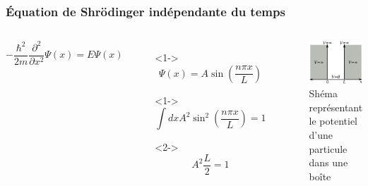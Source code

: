 \documentclass{beamer}
\begin{document}
\begin{frame}
\frametitle{Équation de Shrödinger indépendante du temps}

\begin{columns}

\begin{equation}\tag{4}
-\frac{\hbar^2}{2m}\frac{\partial^2}{\partial x^2}\Psi(x)=E\Psi(x)
\end{equation} 

\begin{itemize}
\item[]<1-> \begin{equation}\tag{5}
\Psi(x)=A\sin(\frac{n\pi x}{L})
\end{equation}  
\item[]<1-> \begin{equation}\tag{6}
\int dx A^2\sin^2(\frac{n\pi x}{L})=1
\end{equation}
\item[]  <2-> \begin{equation}\tag{7}
A^2 \frac{L}{2}=1
\end{equation}
\end{itemize}
\begin{figure}
\includegraphics[scale=0.4]{Pot}
\caption{Shéma représentant le potentiel d'une particule dans une boîte}
\end{figure}
\end{columns}

\end{frame}
\end{document}
